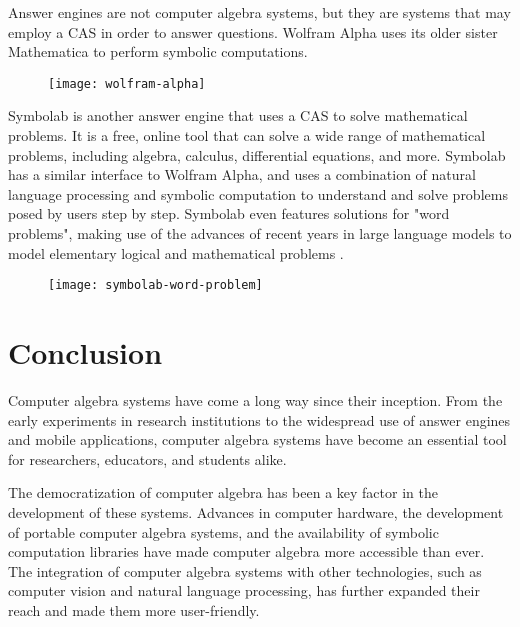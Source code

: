 Answer engines are not computer algebra systems, but they are systems that may employ a CAS in order to answer questions. Wolfram Alpha uses its older sister Mathematica to perform symbolic computations.

\begin{figure}[htb]
      {\texttt{[image: wolfram-alpha]}}
\end{figure}

Symbolab is another answer engine that uses a CAS to solve mathematical problems. It is a free, online tool that can solve a wide range of mathematical problems, including algebra, calculus, differential equations, and more. Symbolab has a similar interface to Wolfram Alpha, and uses a combination of natural language processing and symbolic computation to understand and solve problems posed by users step by step. Symbolab even features solutions for "word problems", making use of the advances of recent years in large language models to model elementary logical and mathematical problems \parencite{symbolab}.

\begin{figure}[htb]
      {\texttt{[image: symbolab-word-problem]}}
\end{figure}

\section{Conclusion}\label{sec:conclusion}

Computer algebra systems have come a long way since their inception. From the early experiments in research institutions to the widespread use of answer engines and mobile applications, computer algebra systems have become an essential tool for researchers, educators, and students alike.

The democratization of computer algebra has been a key factor in the development of these systems. Advances in computer hardware, the development of portable computer algebra systems, and the availability of symbolic computation libraries have made computer algebra more accessible than ever. The integration of computer algebra systems with other technologies, such as computer vision and natural language processing, has further expanded their reach and made them more user-friendly.

